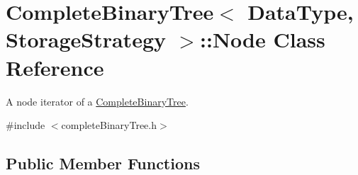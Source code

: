 \hypertarget{class_complete_binary_tree_1_1_node}{
\section{CompleteBinaryTree$<$ DataType, StorageStrategy $>$::Node Class Reference}
\label{class_complete_binary_tree_1_1_node}
}


A node iterator of a \hyperlink{class_complete_binary_tree}{CompleteBinaryTree}.  




{\ttfamily \#include $<$completeBinaryTree.h$>$}

\subsection*{Public Member Functions}
